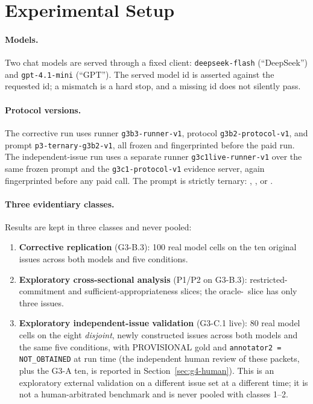 \section{Experimental Setup}
\label{sec:setup}

\paragraph{Models.}
Two chat models are served through a fixed client: \texttt{deepseek-flash}
(``DeepSeek'') and \texttt{gpt-4.1-mini} (``GPT''). The served model id is
asserted against the requested id; a mismatch is a hard stop, and a missing id
does not silently pass.

\paragraph{Protocol versions.}
The corrective run uses runner \texttt{g3b3-runner-v1}, protocol
\texttt{g3b2-protocol-v1}, and prompt \texttt{p3-ternary-g3b2-v1}, all frozen
and fingerprinted before the paid run. The independent-issue run uses a
separate runner \texttt{g3c1live-runner-v1} over the same frozen prompt and
the \texttt{g3c1-protocol-v1} evidence server, again fingerprinted before any
paid call. The prompt is strictly ternary:
\ACCEPT, \REJECT, or \NEED.

\paragraph{Three evidentiary classes.}
Results are kept in three classes and never pooled:
\begin{enumerate}[leftmargin=1.6em,itemsep=1pt,topsep=2pt]
  \item \textbf{Corrective replication} (G3-B.3): 100 real model cells on the
  ten original issues across both models and five conditions.
  \item \textbf{Exploratory cross-sectional analysis} (P1/P2 on G3-B.3):
  restricted-commitment and sufficient-appropriateness slices; the
  oracle-\REJECT\ slice has only three issues.
  \item \textbf{Exploratory independent-issue validation} (G3-C.1 live):
  80 real model cells on the eight \emph{disjoint}, newly constructed issues
  across both models and the same five conditions, with PROVISIONAL gold and
  \texttt{annotator2 = NOT\_OBTAINED} at run time (the independent human
  review of these packets, plus the G3-A ten, is reported in
  Section~\ref{sec:g4-human}). This is an exploratory external
  validation on a different issue set at a different time; it is not a
  human-arbitrated benchmark and is never pooled with classes 1--2.
\end{enumerate}

